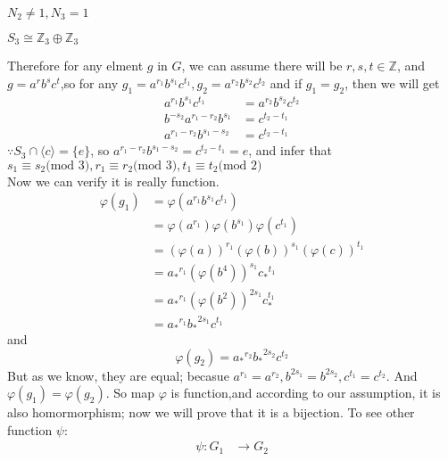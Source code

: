 \documentclass[a4paper,14pt]{article}
\begin{document}
\begin{enumerate}
\begin{item}{$N_2 \neq 1, N_3 = 1$}
\begin{enumerate}
\begin{item}{$S_3\cong \mathbb{Z}_3 \oplus \mathbb{Z}_3$}
\begin{enumerate}
                            Therefore for any elment $g$ in $G$, we can assume there will be $r,s,t \in \mathbb{Z}$, and $g = a^rb^sc^t$,so for any
                            $g_1 = a^{r_1}b^{s_1}c^{t_1}, g_2 = a^{r_2}b^{s_2}c^{t_2}$ and if $g_1 = g_2$, then we will get 
                            \begin{align*}
                                a^{r_1}b^{s_1}c^{t_1} &= a^{r_2}b^{s_2}c^{t_2}\\
                                b^{-s_2}a^{r_1-r_2}b^{s_1} &= c^{t_2-t_1}\\
                                a^{r_1-r_2}b^{s_1-s_2} &= c^{t_2-t_1}
                            \end{align*}
                            $\because S_3 \cap \langle c \rangle = \{e\}$, so $a^{r_1-r_2}b^{s_1-s_2} = c^{t_2-t_1}=e$, and infer that
                            $s_1 \equiv s_2 \text{(mod 3)}, r_1\equiv r_2 \text{(mod 3)}, t_1\equiv t_2 \text{(mod 2)}$\\
                            Now we can verify it is really function.
                            \begin{align*}
                                \varphi(g_1) &= \varphi(a^{r_1}b^{s_1}c^{t_1})\\
                                            &= \varphi(a^{r_1})\varphi(b^{s_1})\varphi(c^{t_1})\\
                                            &= (\varphi(a))^{r_1}(\varphi(b))^{s_1}(\varphi(c))^{t_1}\\
                                            &= {a_*}^{r_1}(\varphi(b^4))^{s_1}{c_*}^{t_1}\\
                                            &= {a_*}^{r_1}(\varphi(b^2))^{2s_1}c_*^{t_1}\\
                                            &= {a_*}^{r_1}{b_*}^{2s_1}c^{t_1}      
                            \end{align*}
                            and
                            $$\varphi(g_2) = {a_*}^{r_2}{b_*}^{2s_2}c^{t_2}$$
                            But as we know, they are equal; becasue $a^{r_1} = a^{r_2}, b^{2s_1}=b^{2s_2},c^{t_1}=c^{t_2}$. And
                            $\varphi(g_1) = \varphi(g_2)$. So map $\varphi$ is function,and according to our assumption, it is also
                            homormorphism; now we will prove that it is a bijection. To see other function $\psi$:
                            \begin{align*}
                                \psi:G_1 &\to G_2\\

\end{align*}
\end{enumerate}
\end{item}
\end{enumerate}
\end{item}
\end{enumerate}
\end{document}
